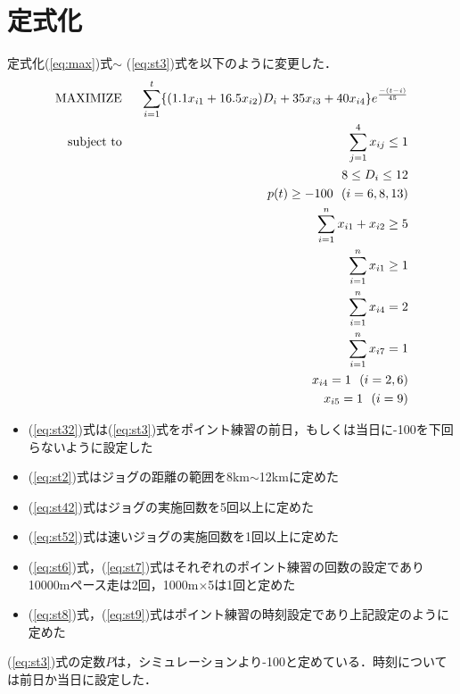 \documentclass[12pt,fleqn]{jreport}
\begin{document}
\section{定式化}
定式化(\ref{eq:max})式$\sim$ (\ref{eq:st3})式を以下のように変更した．
\newpage
\begin{eqnarray}
  \mathop{\rm MAXIMIZE}&\ \ &\sum_{i=1}^t \{(1.1x_{i1}+16.5x_{i2})D_{i}+35x_{i3}+40x_{i4}\}e^{\frac{-(t-i)}{45}}\label{eq:max1}\\%
  \mathop{\rm subject\ to}&\ \ &\sum_{j=1}^4 x_{ij}\leq 1\label{eq:st12}\\%
  &&8\leq D_{i} \leq 12\label{eq:st2}\\%
  &&p(t)\geq -100\ \ (i=6,8,13)\label{eq:st32}\\%
  &&\sum_{i=1}^n x_{i1}+x_{i2}\geq 5\label{eq:st42}\\%
  &&\sum_{i=1}^n x_{i1}\geq 1\label{eq:st52}\\%
  &&\sum_{i=1}^n x_{i4}=2\label{eq:st6}\\%
  &&\sum_{i=1}^n x_{i7}=1\label{eq:st7}\\%
  &&x_{i4}=1\ \ (i=2,6)\label{eq:st8}\\%
  &&x_{i5}=1\ \ (i=9)\label{eq:st9}%
\end{eqnarray}
\newpage
\begin{itemize}
  \item (\ref{eq:st32})式は(\ref{eq:st3})式をポイント練習の前日，もしくは当日に-100を下回らないように設定した
  \item (\ref{eq:st2})式はジョグの距離の範囲を8km$\sim$12kmに定めた
  \item (\ref{eq:st42})式はジョグの実施回数を5回以上に定めた
  \item (\ref{eq:st52})式は速いジョグの実施回数を1回以上に定めた
  \item (\ref{eq:st6})式，(\ref{eq:st7})式はそれぞれのポイント練習の回数の設定であり10000mペース走は2回，1000m$\times$5は1回と定めた
  \item (\ref{eq:st8})式，(\ref{eq:st9})式はポイント練習の時刻設定であり上記設定のように定めた
\end{itemize}
\vspace{1cm}
(\ref{eq:st3})式の定数$P$は，シミュレーションより-100と定めている．時刻については前日か当日に設定した．
\end{document}
